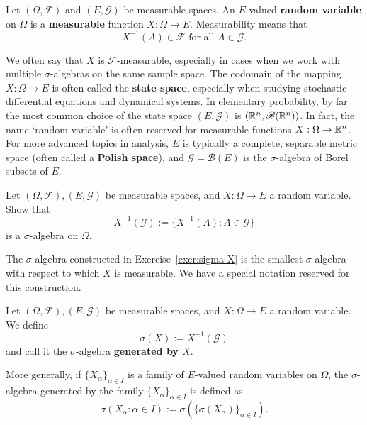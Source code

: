 \begin{definition}
    Let $(\Omega,\mathcal{F})$ and $(E,\mathcal{G})$ be measurable spaces. An $E$-valued \textbf{random variable} on $\Omega$ is a \textbf{measurable} function $X:\Omega\to E$. Measurability means that
    \begin{equation}
    \label{eq:measurable}
        X^{-1}(A) \in\mathcal{F} \text{ for all } A\in\mathcal{G}.
    \end{equation}
\end{definition}
We often say that $X$ is $\mathcal{F}$-measurable, especially in cases when we work with multiple $\sigma$-algebras on the same sample space. The codomain of the mapping $X:\Omega\to E$ is often called the \textbf{state space}, especially when studying stochastic differential equations and dynamical systems. In elementary probability, by far the most common choice of the state space $(E,\mathcal{G})$ is $(\mathbb{R}^n,\mathscr{B}(\mathbb{R}^n))$. In fact, the name `random variable' is often reserved for measurable functions $X:\Omega\to\mathbb{R}^n$. For more advanced topics in analysis, $E$ is typically a complete, separable metric space (often called a \textbf{Polish space}), and $\mathcal{G}=\mathscr{B}(E)$ is the $\sigma$-algebra of Borel subsets of $E$.

\begin{exercise}
\label{exer:sigma-X}
    Let $(\Omega, \mathcal{F}), (E, \mathcal{G})$ be measurable spaces, and $X:\Omega\to E$ a random variable. Show that
    \begin{equation*}
        X^{-1}(\mathcal{G}) := \{X^{-1}(A) : A\in\mathcal{G}\}
    \end{equation*}
    is a $\sigma$-algebra on $\Omega$.
\end{exercise}

The $\sigma$-algebra constructed in Exercise~\ref{exer:sigma-X} is the smallest $\sigma$-algebra with respect to which $X$ is measurable. We have a special notation reserved for this construction.

\begin{definition}
    Let $(\Omega, \mathcal{F}), (E, \mathcal{G})$ be measurable spaces, and $X:\Omega\to E$ a random variable. We define
    \begin{equation*}
        \sigma(X) := X^{-1}(\mathcal{G})
    \end{equation*}
    and call it the $\sigma$-algebra \textbf{generated by $X$}.
    
    More generally, if $\{X_\alpha\}_{\alpha\in I}$ is a family of $E$-valued random variables on $\Omega$, the $\sigma$-algebra generated by the family $\{X_\alpha\}_{\alpha\in I}$ is defined as
    \begin{equation*}
        \sigma(X_\alpha : \alpha\in I) := \sigma(\{\sigma(X_\alpha)\}_{\alpha\in I}).
    \end{equation*}
\end{definition}

